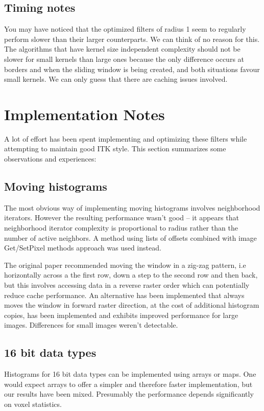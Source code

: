 \documentclass[a4paper]{InsightArticle}
\begin{document}
\subsection{Timing notes}
You may have noticed that the optimized filters of radius 1 seem to
regularly perform slower than their larger counterparts. We can think
of no reason for this. The algorithms that have kernel size
independent complexity should not be slower for small kernels than
large ones because the only difference occurs at borders and when the
sliding window is being created, and both situations favour small
kernels. We can only guess that there are caching issues involved.

\section{Implementation Notes}
A lot of effort has been spent implementing and optimizing these filters 
while attempting to maintain good ITK style. This section summarizes some observations
and experiences:
\subsection{Moving histograms}
The most obvious way of implementing moving histograms involves
neighborhood iterators.  However the resulting performance wasn't good
-- it appears that neighborhood iterator complexity is proportional to
radius rather than the number of active neighbors. A method using
lists of offsets combined with image Get/SetPixel methods approach was
used instead.

The original paper recommended moving the window in a zig-zag pattern, i.e horizontally 
across a the first row, down a step to the second row and then back, but this involves
accessing data in a reverse raster order which can potentially reduce cache performance.
An alternative has been implemented that always moves the window in forward raster direction,
at the cost of additional histogram copies, has been implemented and exhibits improved
performance for large images. Differences for small images weren't detectable.

\subsection{16 bit data types}
Histograms for 16 bit data types can be implemented using arrays or maps. One would
expect arrays to offer a simpler and therefore faster implementation, but our results
have been mixed. Presumably the performance depends significantly on voxel statistics.
\end{document}

